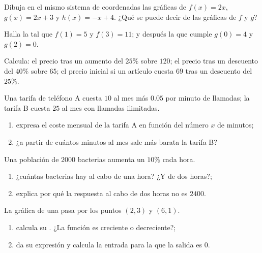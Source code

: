 \begin{exercise}[$\star$]\label{exo:g9:linfunc:4}
Dibuja en el mismo sistema de coordenadas las gráficas de $f(x) = 2x$,
$g(x) = 2x + 3$ y $h(x) = -x + 4$. ¿Qué se puede decir de las gráficas de
$f$ y $g$?
\end{exercise}

\begin{exercise}[$\star$]\label{exo:g9:linfunc:5}
Halla la  tal que $f(1) = 5$ y $f(3) = 11$; y después la
que cumple $g(0) = 4$ y $g(2) = 0$.
\end{exercise}

\begin{exercise}[$\star\star$]\label{exo:g9:linfunc:6}
Calcula: el precio tras un aumento del $25\%$ sobre $120$; el precio tras un
descuento del $40\%$ sobre $65$; el precio inicial si un artículo cuesta $69$
tras un descuento del $25\%$.
\end{exercise}

\begin{exercise}[$\star\star$]\label{exo:g9:linfunc:7}
Una tarifa de teléfono A cuesta $10$ al mes más $0.05$ por minuto de llamadas; la tarifa
B cuesta $25$ al mes con llamadas ilimitadas.
\begin{enumerate}
  \item expresa el coste mensual de la tarifa A en función del número
        $x$ de minutos;
  \item ¿a partir de cuántos minutos al mes sale más barata la tarifa B?
\end{enumerate}
\end{exercise}

\begin{exercise}[$\star\star$]\label{exo:g9:linfunc:8}
Una población de $2000$ bacterias aumenta un $10\%$ cada hora.
\begin{enumerate}
  \item ¿cuántas bacterias hay al cabo de una hora? ¿Y de dos horas?;
  \item explica por qué la respuesta al cabo de dos horas no es $2400$.
\end{enumerate}
\end{exercise}

\begin{exercise}[$\star\star$]\label{exo:g9:linfunc:9}
La gráfica de una  pasa por los puntos $(2, 3)$ y
$(6, 1)$.
\begin{enumerate}
  \item calcula su . ¿La función es creciente o decreciente?;
  \item da su expresión y calcula la entrada para la que la salida
        es $0$.
\end{enumerate}
\end{exercise}


